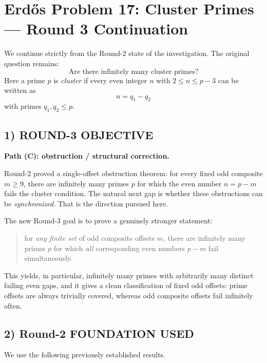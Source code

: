 \section{Erd\H{o}s Problem 17: Cluster Primes --- Round 3 Continuation}

We continue strictly from the Round-2 state of the investigation. The original question remains:
\[
\text{Are there infinitely many cluster primes?}
\]
Here a prime $p$ is \emph{cluster} if every even integer $n$ with $2\le n\le p-3$ can be written as
\[
n=q_1-q_2
\]
with primes $q_1,q_2\le p$.

\subsection*{1) ROUND-3 OBJECTIVE}

\textbf{Path (C): obstruction / structural correction.}

Round-2 proved a single-offset obstruction theorem: for every fixed odd composite $m\ge 9$, there are infinitely many primes $p$ for which the even number $n=p-m$ fails the cluster condition. The natural next gap is whether these obstructions can be \emph{synchronized}. That is the direction pursued here.

The new Round-3 goal is to prove a genuinely stronger statement:
\begin{quote}
for \emph{any finite set} of odd composite offsets $m$, there are infinitely many primes $p$ for which \emph{all} corresponding even numbers $p-m$ fail simultaneously.
\end{quote}
This yields, in particular, infinitely many primes with arbitrarily many distinct failing even gaps, and it gives a clean classification of fixed odd offsets: prime offsets are always trivially covered, whereas odd composite offsets fail infinitely often.

\subsection*{2) Round-2 FOUNDATION USED}

We use the following previously established results.

